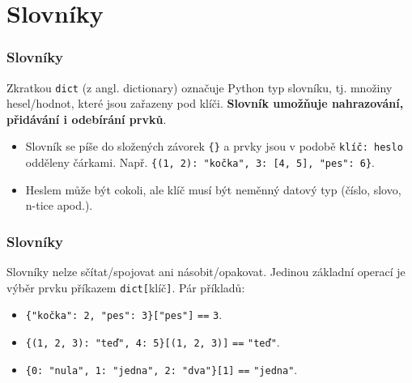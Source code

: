 \documentclass[aspectratio=169,11pt]{beamer}
\begin{document}
\section[Slovníky]{Slovníky}

\begin{frame}[plain]
 \sectionpage
\end{frame}

\begin{frame}
 \frametitle{Slovníky}
 \begin{tcolorbox}[title=Datový typ \texttt{dict}]
  Zkratkou \texttt{\alert{dict}} (z angl. \alert{dict}ionary) označuje Python
  typ slovníku, tj. množiny hesel/hodnot, které jsou zařazeny pod klíči.
  \textbf{Slovník umožňuje nahrazování, přidávání i odebírání prvků}.
 \end{tcolorbox}
 \begin{itemize}
  \item<2-> Slovník se píše do složených závorek \texttt{\{\}} a prvky jsou v podobě
   \texttt{klíč: heslo} odděleny čárkami. Např. \texttt{\{(1, 2): "kočka", 3:
   [4, 5], "pes": 6\}}.
  \item<3-> Heslem může být cokoli, ale klíč musí být \alert{neměnný datový typ}
   (číslo, slovo, n-tice apod.).
 \end{itemize}
\end{frame}

\begin{frame}
 \frametitle{Slovníky}
 Slovníky nelze sčítat/spojovat ani násobit/opakovat. Jedinou základní operací
 je výběr prvku příkazem \texttt{dict[}klíč\texttt{]}. Pár příkladů:
 \begin{itemize}
  \item<2-> \texttt{\{"kočka": 2, "pes": 3\}["pes"]} \texttt{==} \texttt{3}.
  \item<3-> \texttt{\{(1, 2, 3): "teď", 4: 5\}[(1, 2, 3)]} \texttt{==}
   \texttt{"teď"}.
  \item<4-> \texttt{\{0: "nula", 1: "jedna", 2: "dva"\}[1]} \texttt{==}
   \texttt{"jedna"}.
 \end{itemize}
\end{frame}
\end{document}
